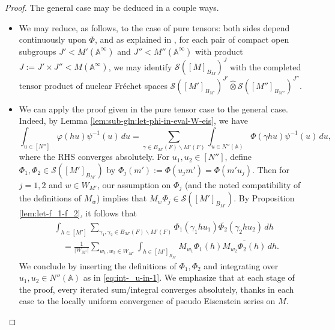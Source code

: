 \documentclass[reqno]{amsart}
\theoremstyle{plain} \newtheorem{theorem} {Theorem}
\theoremstyle{definition} \newtheorem{definition} [theorem] {Definition}
\theoremstyle{itplain} %
\numberwithin{equation}{section}
\numberwithin{theorem}{section}
\begin{document}
\begin{proof}
The general case may be deduced in a couple ways.
\begin{itemize}
\item We may reduce, as follows, to the case of pure tensors: both sides depend continuously upon $\Phi$, and as explained in \cite[\S2.5.9]{2020arXiv200705601B}, for each pair of compact open subgroups $J' < M'(\mathbb{A}^\infty)$ and $J'' < M''(\mathbb{A}^\infty)$ with product $J := J' \times J'' < M(\mathbb{A}^\infty)$, we may identify $\mathcal{S}([M]_{B_M})^J$ with the completed tensor product of nuclear Fr{\'e}chet spaces $\mathcal{S}([M']_{B_{M'}})^{J'} \hat{\otimes} \mathcal{S}([M'']_{B_{M''}})^{J''}$.
\item We can apply the proof given in the pure tensor case to the general case.  Indeed, by Lemma \ref{lem:sub-gln:let-phi-in-eval-W-eis}, we have
  \begin{equation}\label{eq:int-_u-in-1}
    \int _{u \in [N'']} \varphi(h u) \psi^{-1}(u) \, d u
    =
    \sum _{\gamma \in B_{M'}(F) \backslash M'(F)}
    \int _{u \in N''(\mathbb{A})}
    \Phi(\gamma h u)
    \psi^{-1}(u) \,  d u,
  \end{equation}
  where the RHS converges absolutely.  For $u_1, u_2 \in [N'']$, define $\Phi_1, \Phi_2 \in \mathcal{S}([M']_{B_{M'}})$ by $\Phi_j(m') := \Phi(u_j m') = \Phi(m' u_j)$.  Then for $j =1,2$ and $w \in W_{M'}$, our assumption on $\Phi_j$ (and the noted compatibility of the definitions of $M_w$) implies that $M_w \Phi_j \in \mathcal{S}([M']_{B_{M'}})$.  By Proposition \ref{lem:let-f_1-f_2}, it follows that
  \begin{align*}
    &\int _{h \in [M']}
    \sum _{\gamma_1, \gamma_2 \in B_{M'}(F) \backslash M'(F)}
    \Phi_1(\gamma_1 h u_1)
    \overline{\Phi_2}(\gamma_2 h u_2) \, d h \\
    &\quad =
    \frac{1}{|W_{M'}|}
    \sum _{w_1, w_2 \in W_{M'}}
    \int _{h \in [M']_{B_{M'}}}
    M_{w_1} \Phi_1(h)
    \overline{M_{w_2} \Phi_2(h)} \, d h.
  \end{align*}
  We conclude by inserting the definitions of $\Phi_1, \Phi_2$ and integrating over $u_1, u_2 \in N''(\mathbb{A})$ as in \eqref{eq:int-_u-in-1}.  We emphasize that at each stage of the proof, every iterated sum/integral converges absolutely, thanks in each case to the locally uniform convergence of pseudo Eisenstein series on $M$.  
\end{itemize}

\end{proof}
\end{document}
